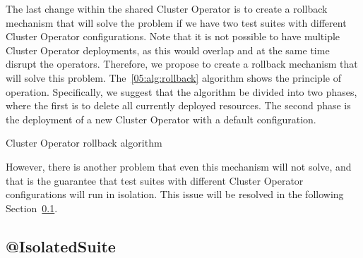 The last change within the shared Cluster Operator is to create a rollback mechanism that will solve the problem if we have two test suites with different Cluster Operator configurations.
Note that it is not possible to have multiple Cluster Operator deployments, as this would overlap and at the same time disrupt the operators.
Therefore, we propose to create a rollback mechanism that will solve this problem.
The~\ref{05:alg:rollback} algorithm shows the principle of operation.
Specifically, we suggest that the algorithm be divided into two phases, where the first is to delete all currently deployed resources.
The second phase is the deployment of a new Cluster Operator with a default configuration.
\begin{algorithm}[H]
    \caption{Cluster Operator rollback algorithm}
    \label{05:alg:rollback}
    \begin{algorithmic}[1]
        \EndIf
        \EndIf
        \EndIf

        \State
    \end{algorithmic}
\end{algorithm}

However, there is another problem that even this mechanism will not solve, and that is the guarantee that test suites with different Cluster Operator configurations will run in isolation.
This issue will be resolved in the following Section~\ref{05:isolatedsuite}.

\subsection{@IsolatedSuite}
\label{05:isolatedsuite}

